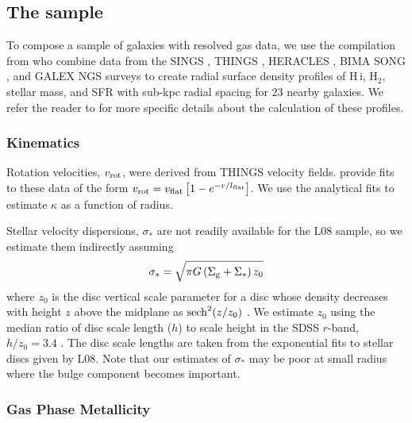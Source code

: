 \documentclass[fleqn,usenatbib]{mnras}
\newcommand{\HI}{{\sc H\,i}}
\begin{document}
\subsection{The \citet[L08]{Leroy08} sample}
To compose a sample of galaxies with resolved gas data, we use the compilation from \citet{Leroy08} who combine data from the SINGS \citep{Kennicutt03}, THINGS \citep{Walter08}, HERACLES \citep{Leroy09}, BIMA SONG \citep{Helfer03}, and GALEX NGS \citep{GildePaz07} surveys to create radial surface density profiles of \HI, H$_2$, stellar mass, and SFR with sub-kpc radial spacing for 23 nearby galaxies.  We refer the reader to \citet{Leroy08} for more specific details about the calculation of these profiles.

\subsubsection{Kinematics}

Rotation velocities, $v_{\rm rot}$, were derived from THINGS velocity fields.  \citet{Leroy08} provide fits to these data of the form $v_{\rm rot}=v_{\rm flat}\left[1-e^{-r/l_{\rm flat}}\right]$.  We use the analytical fits to estimate $\kappa$ as a function of radius.

Stellar velocity dispersions, $\sigma_*$ are not readily available for the L08 sample, so we estimate them indirectly assuming
\begin{equation}
\sigma_*=\sqrt{\pi G \left(\Sigma_{\rm g} + \Sigma_*\right)z_0}
\label{eq:sigma_s}
\end{equation}
where $z_0$ is the disc vertical scale parameter for a disc whose density decreases with height $z$ above the midplane as ${\rm sech}^2(z/z_0)$ \citep{VanDerKruit81}.  We estimate $z_0$ using the median ratio of disc scale length ($h$) to scale height in the SDSS $r$-band, $h/z_0=3.4$ \citep{Bizyaev14}.  The disc scale lengths are taken from the exponential fits to stellar discs given by L08.  Note that our estimates of $\sigma_*$ may be poor at small radius where the bulge component becomes important.

\subsubsection{Gas Phase Metallicity}
\end{document}
